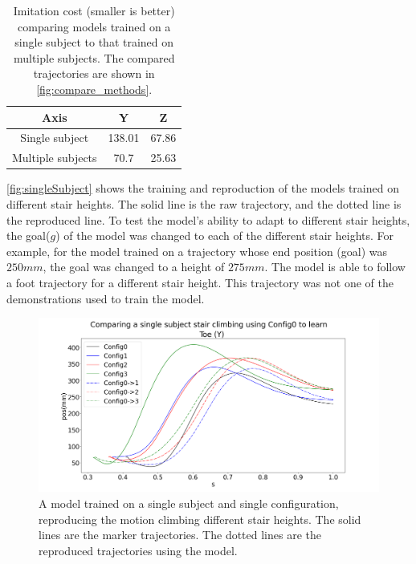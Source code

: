 \begin{table}[h]
\large 
     \centering 
     \begin{tabular}{||c|| c c ||}  
     \hline 
         Axis     & Y & Z  \\ [0.5ex]  
         \hline\hline 
         Single subject   & 138.01 & 67.86  \\  
         \hline 
         Multiple subjects & 70.7 & 25.63  \\ 
         \hline      
     \end{tabular} 
     \caption{Imitation cost (smaller is better) comparing models trained on a single subject to that trained on multiple subjects. The compared trajectories are shown in \autoref{fig:compare_methods}. } 
     \label{tab:error} 
\end{table} 


\autoref{fig:singleSubject} shows the training and reproduction of the models trained on different stair heights. The solid line is the raw trajectory, and the dotted line is the reproduced line. To test the model's ability to adapt to different stair heights, the goal($g$) of the model was changed to each of the different stair heights. For example, for the model trained on a trajectory whose end position (goal) was $250mm$, the goal was changed to a height of $275mm$. The model is able to follow a foot trajectory for a different stair height. This trajectory was not one of the demonstrations used to train the model.


\begin{figure}
    \centering
    \includegraphics[scale=0.20]{images/compareHeihgts.png}
    \caption{A model trained on a single subject and single configuration, reproducing the motion climbing different stair heights. The solid lines are the marker trajectories. The dotted lines are the reproduced trajectories using the model.}
    \label{fig:singleSubject}
\end{figure}

